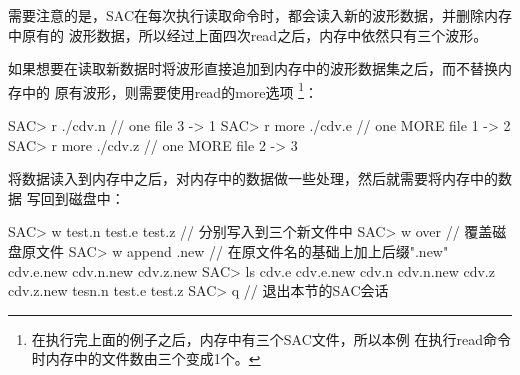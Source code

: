 需要注意的是，SAC在每次执行读取命令时，都会读入新的波形数据，并删除内存中原有的
波形数据，所以经过上面四次read之后，内存中依然只有三个波形。

如果想要在读取新数据时将波形直接追加到内存中的波形数据集之后，而不替换内存中的
原有波形，则需要使用read的more选项
\footnote{在执行完上面的例子之后，内存中有三个SAC文件，所以本例
在执行read命令时内存中的文件数由三个变成1个。}：
\begin{SACCode}
SAC> r ./cdv.n              // one file       3 -> 1
SAC> r more ./cdv.e         // one MORE file  1 -> 2
SAC> r more ./cdv.z         // one MORE file  2 -> 3
\end{SACCode}

将数据读入到内存中之后，对内存中的数据做一些处理，然后就需要将内存中的数据
写回到磁盘中：
\begin{SACCode}
SAC> w test.n test.e test.z         // 分别写入到三个新文件中
SAC> w over                         // 覆盖磁盘原文件
SAC> w append .new                  // 在原文件名的基础上加上后缀".new"
cdv.e.new cdv.n.new cdv.z.new
SAC> ls
cdv.e cdv.e.new cdv.n cdv.n.new cdv.z cdv.z.new tesn.n test.e test.z
SAC> q                              // 退出本节的SAC会话
\end{SACCode}
